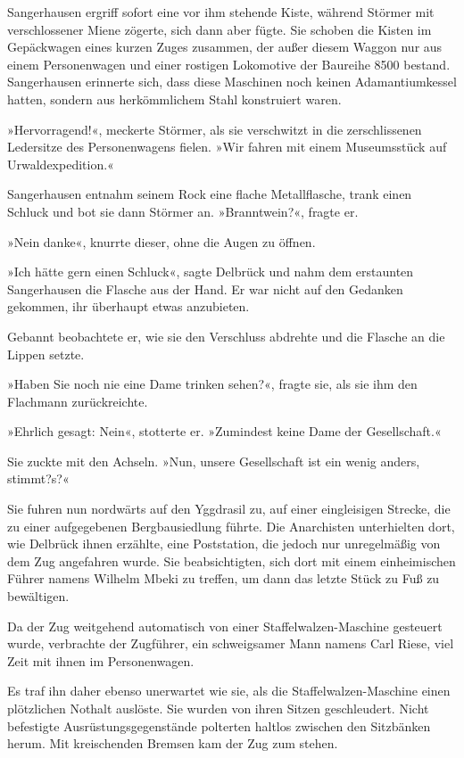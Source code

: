 Sangerhausen ergriff sofort eine vor ihm stehende Kiste, während
Störmer mit verschlossener Miene zögerte, sich dann aber fügte. Sie
schoben die Kisten im Gepäckwagen eines kurzen Zuges zusammen, der
außer diesem Waggon nur aus einem Personenwagen und einer rostigen
Lokomotive der Baureihe 8500 bestand. Sangerhausen erinnerte sich,
dass diese Maschinen noch keinen Adamantiumkessel hatten, sondern
aus herkömmlichem Stahl konstruiert waren.

»Hervorragend!«, meckerte Störmer, als sie verschwitzt in die
zerschlissenen Ledersitze des Personenwagens fielen. »Wir fahren
mit einem Museumsstück auf Urwaldexpedition.«

Sangerhausen entnahm seinem Rock eine flache Metallflasche, trank
einen Schluck und bot sie dann Störmer an. »Branntwein?«, fragte
er.

»Nein danke«, knurrte dieser, ohne die Augen zu öffnen.

»Ich hätte gern einen Schluck«, sagte Delbrück und nahm dem
erstaunten Sangerhausen die Flasche aus der Hand. Er war nicht auf
den Gedanken gekommen, ihr überhaupt etwas anzubieten.

Gebannt beobachtete er, wie sie den Verschluss abdrehte und die
Flasche an die Lippen setzte.

»Haben Sie noch nie eine Dame trinken sehen?«, fragte sie, als sie
ihm den Flachmann zurückreichte.

»Ehrlich gesagt: Nein«, stotterte er. »Zumindest keine Dame der
Gesellschaft.«

Sie zuckte mit den Achseln. »Nun, unsere Gesellschaft ist ein wenig
anders, stimmt?s?«

\bigpar

Sie fuhren nun nordwärts auf den Yggdrasil zu, auf einer
eingleisigen Strecke, die zu einer aufgegebenen Bergbausiedlung
führte. Die Anarchisten unterhielten dort, wie Delbrück ihnen
erzählte, eine Poststation, die jedoch nur unregelmäßig von dem Zug
angefahren wurde. Sie beabsichtigten, sich dort mit einem
einheimischen Führer namens Wilhelm Mbeki zu treffen, um dann das
letzte Stück zu Fuß zu bewältigen.

Da der Zug weitgehend automatisch von einer Staffelwalzen-Maschine
gesteuert wurde, verbrachte der Zugführer, ein schweigsamer Mann
namens Carl Riese, viel Zeit mit ihnen im Personenwagen.

Es traf ihn daher ebenso unerwartet wie sie, als die
Staffelwalzen-Maschine einen plötzlichen Nothalt auslöste. Sie
wurden von ihren Sitzen geschleudert. Nicht befestigte
Ausrüstungsgegenstände polterten haltlos zwischen den Sitzbänken
herum. Mit kreischenden Bremsen kam der Zug zum stehen.

